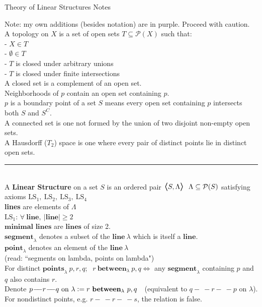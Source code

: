 \documentclass{article}
\newcommand{\hsp}[1][5]{\hspace{0.#1 cm}}
\newcommand{\bra}[1][1.2]{\scalebox{#1}{$\boldsymbol{\langle}$}}
\newcommand{\nl}[1][12]{\\[#1pt]}
\newcommand{\ket}[1][1.2]{\scalebox{#1}{$\boldsymbol{\rangle}$}}
\newcommand{\defeq}{\vcentcolon=}
\newcommand{\ch}[1]{\text{#1}}
\newcommand {\chb}[1]{\textbf{#1}}
\newcommand{\seg}{\!-\!\!\!\!\:-}
\begin{document}
\begin{center}
Theory of Linear Structures Notes
\end{center}
\begin{flushleft}
\hangindent=1.1cm 
Note: my own additions (besides notation) are in {\color{purple} purple}. Proceed with caution.\nl[6]
A topology on $X$ is a set of open sets $T\subseteq \mathcal{P}(X)$ such that:\nl[6]
 - $X \in T$\\
 - $\emptyset \in T$\\
 - $T$ is closed under arbitrary unions\\
 - $T$ is closed under finite intersections\nl[6]
A closed set is a complement of an open set.\\
Neighborhoods of $p$ contain an open set containing $p$.\\
$p$ is a boundary point of a set $S$ means every open set containing $p$ intersects both $S$ and $S^C$.\\
A connected set is one not formed by the union of two disjoint non-empty open sets.\\
A Hausdorff ($T_2$) space is one where every pair of distinct points lie in distinct open sets.\nl[7]

\par\noindent\rule{\textwidth}{0.4pt}\nl[5] %

A \chb{Linear Structure} on a set $S$ is an ordered pair $\bra S, \Lambda \ket\ \ \Lambda \subseteq \mathcal{P}(S)$ satisfying axioms $\ch{LS}_1,\ \ch{LS}_2,\ \ch{LS}_3,\ \ch{LS}_4$\nl[6]
\hsp[2]\textbf{lines} are elements of $\Lambda$\nl[12]

$\ch{LS}_1$: $\forall\ \chb{line},\  |\chb{line}|\geq 2$\nl[6]\hsp[2]
$\chb{minimal lines}$ are $\chb{lines}$ of size 2.\\\hsp[2]
$\chb{segment}_\lambda$ denotes a subset of the $\chb{line}\ \lambda$ which is itself a $\chb{line}$.\\\hsp[2]
$\chb{point}_\lambda$ denotes an element of the $\chb{line}\ \lambda $\\\hsp[2]
(read: ``segments on lambda, points on lambda")\nl[6]
\hsp[2] For distinct $\chb{points}_\lambda\ p,r,q$; $\ \ r\  \chb{between}_\lambda\ p,q \iff$ any $\chb{segment}_\lambda$ containing $p$ and $q$ also contains $r$.\\
\hsp[2] Denote $p \seg r \seg q \ch{ on }\lambda \defeq r\ \chb{between}_\lambda\ p,q\ \ $ (equivalent to $q \seg r \seg p$ on $\lambda$).\\
\hsp[2] For nondistinct points, e.g. $r\seg r\seg s$, the relation is false.\nl[12]


\end{flushleft}
\end{document}
